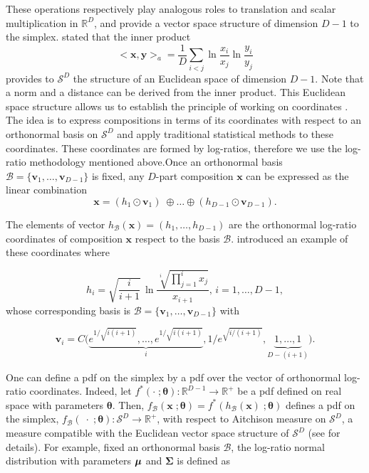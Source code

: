 \documentclass[12pt, a4paper]{article}
\newcommand{\m}[1]{\boldsymbol{#1}}
\begin{document}
These operations respectively play analogous roles to translation and scalar multiplication in $\mathbb{R}^D$, and provide a vector space
structure of dimension $D-1$ to the simplex. \cite{pawlowsky2001geometric} stated that the inner product 
\begin{equation}
<\textbf{x}, \textbf{y}>_a = \frac{1}{D} \sum_{i < j} \ln \frac{x_i}{x_j} \ln \frac{y_i}{y_j}
\label{inner_prod}
\end{equation}
 provides to $\mathcal{S}^D$ the structure of an Euclidean space of dimension $D-1$. Note that a norm and a distance can be derived from the inner product.
This Euclidean space structure allows us to establish the principle of working on coordinates \citep{figueras2011principle}. The idea is to express compositions in terms of its coordinates with respect to an orthonormal basis on $\mathcal{S}^D$ and apply
traditional statistical methods to these coordinates. These coordinates are formed by log-ratios, therefore we use the log-ratio methodology mentioned above.Once an orthonormal basis $\mathcal{B} = \{\textbf{v}_1, \dots, \textbf{v}_{D-1}\}$ is fixed, any $D$-part composition $\textbf{x}$ can be expressed as the linear combination
\[
\textbf{x} = (h_1 \odot \textbf{v}_1)\; \oplus \dots  \oplus (h_{D-1} \odot \textbf{v}_{D-1}).
\]

The elements of vector $h_\mathcal{B}(\textbf{x})=(h_1, \dots, h_{D-1})$ are the orthonormal log-ratio coordinates of composition $\textbf{x}$ respect to the basis $\mathcal{B}$. \cite{egozcue2003isometric} introduced an example of these coordinates where

\begin{equation}
\label{eilr}
h_i=\sqrt{\frac{i}{i+1}}\,\ln\frac{\sqrt[i]
{\prod_{j=1}^{i} x_j}}{x_{i+1}},\,i=1,\dots,D-1,
\end{equation}
whose corresponding basis is $\mathcal{B} = \{\textbf{v}_1, \dots, \textbf{v}_{D-1}\}$ with

\[
\textbf{v}_i = C\Big( \underbrace{e^{1/\sqrt{i(i+1)}}, \dots, e^{1/\sqrt{i(i+1)}}}_{i}, 1/e^{\sqrt{ i/(i+1)}}, \underbrace{1, \dots, 1}_{D-(i+1)} \Big).
\]


One can define a pdf on the simplex by a pdf over the vector of orthonormal log-ratio coordinates. Indeed, let $f^*(\cdot \;; \m\theta) : \mathbb{R}^{D-1} \rightarrow \mathbb{R}^+$ be a pdf defined on real space with parameters $\m\theta$. Then, $f_\mathcal{B}(\mathbf{x}\;; \m\theta) = f^*(h_\mathcal{B}(\textbf{x})\;; \m\theta)$ defines a pdf on the simplex, $f_\mathcal{B}(\;\cdot\;; \m\theta): \mathcal{S}^D \rightarrow \mathbb{R}^+$, with respect to Aitchison measure on $\mathcal{S}^D$, a measure compatible with the Euclidean vector space structure of $\mathcal{S}^D$ (see \cite{mateu2013normal} for details). For example, fixed an orthonormal basis $\mathcal{B}$, the log-ratio normal distribution with parameters $\mbox{\boldmath \(\mu\)}$ and $\mathbf{\Sigma}$ is defined as
\end{document}
